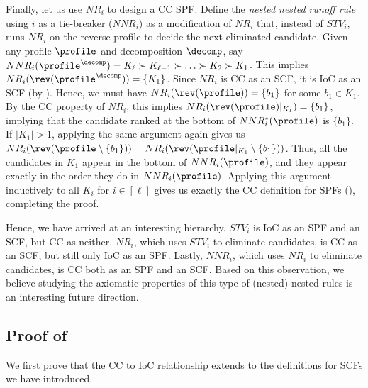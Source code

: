 Finally, let us use $NR_i$ to design a CC SPF. Define the \emph{nested nested runoff rule} using $i$ as a tie-breaker ($NNR_i$) as a modification of $NR_i$ that, instead of $STV_i$, runs $NR_i$ on the reverse profile to decide the next eliminated candidate. Given any profile $\profile$ and decomposition $\decomp$, say $NNR_i(\profile^{\decomp})=K_\ell \succ K_{\ell-1}\succ \ldots \succ K_2 \succ K_1$. This implies $NR_i(\rev(\profile^{\decomp}))=\{K_1\}$. Since $NR_i$ is CC as an SCF, it is IoC as an SCF (by ). Hence, we must have $NR_i(\rev(\profile))=\{b_1\}$ for some $b_1 \in K_1$. By the CC property of $NR_i$, this implies $NR_i(\rev(\profile)|_{K_1})=\{b_1\}$, implying that the candidate ranked at the bottom of $NNR^*_i(\profile)$ is $\{b_1\}$. If $|K_1|>1$, applying the same argument again gives us $NR_i(\rev(\profile \setminus \{b_1\} ))= NR_i(\rev(\profile|_{K_1} \setminus \{b_1\}))$. Thus, all the candidates in $K_1$ appear in the bottom of $NNR_i(\profile)$, and they appear exactly in the order they do in $NNR_i(\profile)$. Applying this argument inductively to all $K_i$ for $i \in [\ell]$ gives us exactly the CC definition for SPFs (), completing the proof.

Hence, we have arrived at an interesting hierarchy. $STV_i$ is IoC as an SPF and an SCF, but CC as neither. $NR_i$, which uses $STV_{i}$ to eliminate candidates, is CC as an SCF, but still only IoC as an SPF. Lastly, $NNR_i$, which uses $NR_i$ to eliminate candidates, is CC both as an SPF and an SCF. Based on this observation, we believe studying the axiomatic properties of this type of (nested) nested rules is an interesting future direction. 

\subsection{Proof of }
We first prove that the CC to IoC relationship extends to the definitions for SCFs we have introduced.

\spfccioc*

